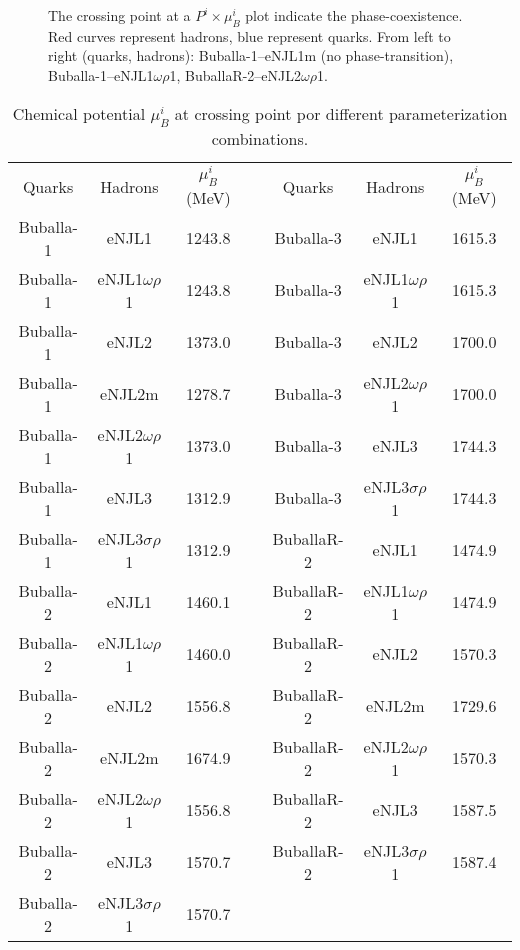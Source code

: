 \documentclass{ws-ijmpcs}
\begin{document}
\begin{figure}
\caption{The crossing point at a $P^i \times \mu_B^i$ plot indicate the phase-coexistence. Red curves represent hadrons, blue represent quarks. From left to right (quarks, hadrons): Buballa-1--eNJL1m (no phase-transition), Buballa-1--eNJL1$\omega\rho$1, BuballaR-2--eNJL2$\omega\rho$1.\label{Fig:Pressure_func_chemical_pot}}

\end{figure}

\begin{table}
\centering
\caption{Chemical potential $\mu_B^i$ at crossing point por different parameterization combinations. \label{Tab:Transition_chemical_pot}}
\begin{tabular}{ccccccc}
\toprule
Quarks & Hadrons & $\mu_B^i$ (MeV) &\phantom{~o~}& Quarks & Hadrons & $\mu_B^i$ (MeV)\\
\cmidrule{1-3} \cmidrule{5-7}
Buballa-1 & eNJL1 & 1243.8 && Buballa-3 & eNJL1 & 1615.3 \\
Buballa-1 & eNJL1$\omega\rho$1 & 1243.8 && Buballa-3 & eNJL1$\omega\rho$1 & 1615.3 \\
Buballa-1 & eNJL2 & 1373.0 && Buballa-3 & eNJL2 & 1700.0 \\
Buballa-1 & eNJL2m & 1278.7 && Buballa-3 & eNJL2$\omega\rho$1 & 1700.0 \\
Buballa-1 & eNJL2$\omega\rho$1 & 1373.0 && Buballa-3 & eNJL3 & 1744.3 \\
Buballa-1 & eNJL3 & 1312.9 && Buballa-3 & eNJL3$\sigma\rho$1 & 1744.3 \\
Buballa-1 & eNJL3$\sigma\rho$1 & 1312.9 && BuballaR-2 & eNJL1 & 1474.9 \\
Buballa-2 & eNJL1 & 1460.1 && BuballaR-2 & eNJL1$\omega\rho$1 & 1474.9 \\
Buballa-2 & eNJL1$\omega\rho$1 & 1460.0 && BuballaR-2 & eNJL2 & 1570.3 \\
Buballa-2 & eNJL2 & 1556.8 && BuballaR-2 & eNJL2m & 1729.6 \\
Buballa-2 & eNJL2m & 1674.9 && BuballaR-2 & eNJL2$\omega\rho$1 & 1570.3 \\
Buballa-2 & eNJL2$\omega\rho$1 & 1556.8 && BuballaR-2 & eNJL3 & 1587.5 \\
Buballa-2 & eNJL3 & 1570.7 && BuballaR-2 & eNJL3$\sigma\rho$1 & 1587.4 \\
Buballa-2 & eNJL3$\sigma\rho$1 & 1570.7 \\

\bottomrule
\end{tabular}
\end{table}
\end{document}
